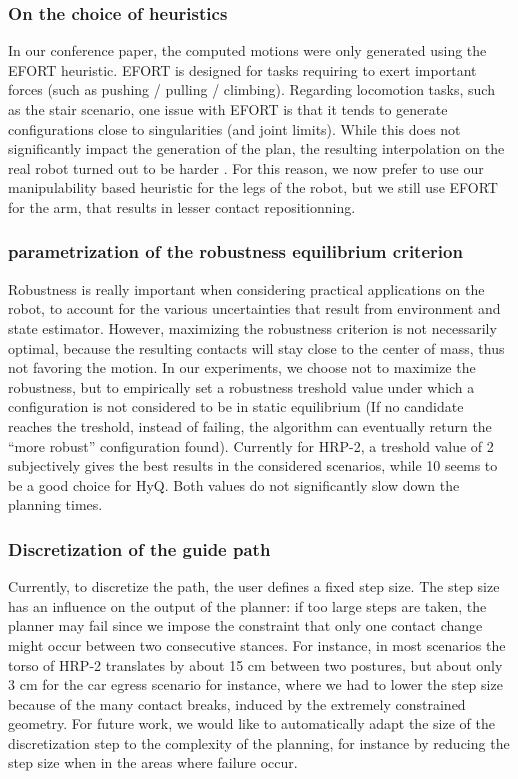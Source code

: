 \subsubsection{On the choice of heuristics} \label{sec:heuristics}
In our conference paper, the computed motions were only generated using the EFORT heuristic.
EFORT is designed for tasks requiring to exert important forces (such as pushing / pulling / climbing). 
Regarding locomotion tasks, such as the stair scenario, one issue with EFORT is that it tends to generate
configurations close to singularities (and joint limits). While this does not significantly impact
the generation of the plan, the resulting interpolation on the real robot turned out to be harder \citep{Carpentier2016}.
For this reason, we now prefer to use our manipulability based heuristic for the legs of the robot, but we still
use EFORT for the arm, that results in lesser contact repositionning.

\subsubsection{parametrization of the robustness equilibrium criterion} \label{sec:parrob}
Robustness is really important when considering practical applications on the robot, to account 
for the various uncertainties that result from environment and state estimator. However,
maximizing the robustness criterion is not necessarily optimal, because the resulting contacts will stay close to the center
of mass, thus not favoring the motion. In our experiments, we choose not to maximize the robustness,
but to empirically set a robustness treshold value under which a configuration is not considered to be in
static equilibrium (If no candidate reaches the treshold, instead of failing, the algorithm can eventually return the ``more robust'' configuration
found). Currently for HRP-2, a treshold value of 2 subjectively gives the best results in the considered scenarios, while 10 seems to be a good choice for HyQ. Both values do not
significantly slow down the planning times.

\subsubsection{Discretization of the guide path} \label{sec:disc}
Currently, to discretize the path, the user defines a fixed step size. The step size
has an influence on the output of the planner: if too large steps are taken,
the planner may fail since we impose the constraint that only one contact change might occur
between two consecutive stances. For instance, in most scenarios the torso of HRP-2 translates by about 15 cm between two postures, but about only 3 cm
for the car egress scenario for instance, where we had to lower the step size because of the many contact breaks, induced by the extremely constrained geometry.
For future work, we would like to automatically adapt the size of the discretization step to the complexity of the planning, for instance
by reducing the step size when in the areas where failure occur.

